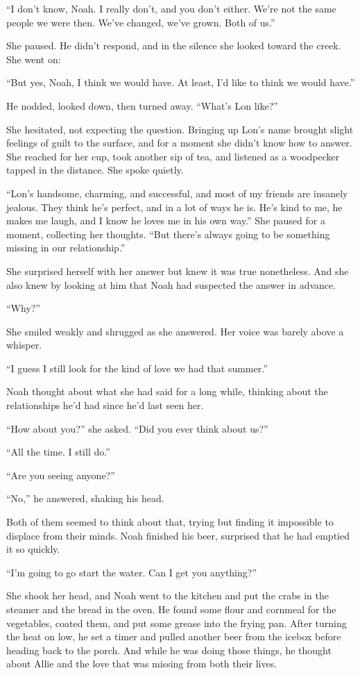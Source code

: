 \documentclass[10pt, twoside, openright]{book}
\begin{document}
``I don't know, Noah. I really don't, and you don't either. We're not
the same people we were then. We've changed, we've grown. Both of us.''

She paused. He didn't respond, and in the silence she looked toward the
creek. She went on:

``But yes, Noah, I think we would have. At least, I'd like to think we
would have.''


He nodded, looked down, then turned away. ``What's Lon like?''


She hesitated, not expecting the question. Bringing up Lon's name
brought slight feelings of guilt to the surface, and for a moment she
didn't know how to answer. She reached for her cup, took another sip of
tea, and listened as a woodpecker tapped in the distance. She spoke
quietly.

``Lon's handsome, charming, and successful, and most of my friends are
insanely jealous. They think he's perfect, and in a lot of ways he is.
He's kind to me, he makes me laugh, and I know he loves me in his own
way.'' She paused for a moment, collecting her thoughts. ``But there's
always going to be something missing in our relationship.''

She surprised herself with her answer but knew it was true nonetheless.
And she also knew by looking at him that Noah had suspected the answer
in advance.


``Why?''


She smiled weakly and shrugged as she answered. Her voice was barely
above a whisper.


``I guess I still look for the kind of love we had that summer.''


Noah thought about what she had said for a long while, thinking about
the relationships he'd had since he'd last seen her.


``How about you?'' she asked. ``Did you ever think about us?''

``All the time. I still do.''

``Are you seeing anyone?''

``No,'' he answered, shaking his head.


Both of them seemed to think about that, trying but finding it
impossible to displace from their minds. Noah finished his beer,
surprised that he had emptied it so quickly.


``I'm going to go start the water. Can I get you anything?''


She shook her head, and Noah went to the kitchen and put the crabs in
the steamer and the bread in the oven. He found some flour and cornmeal
for the vegetables, coated them, and put some grease into the frying
pan. After turning the heat on low, he set a timer and pulled another
beer from the icebox before heading back to the porch. And while he was
doing those things, he thought about Allie and the love that was missing
from both their lives.
\end{document}
